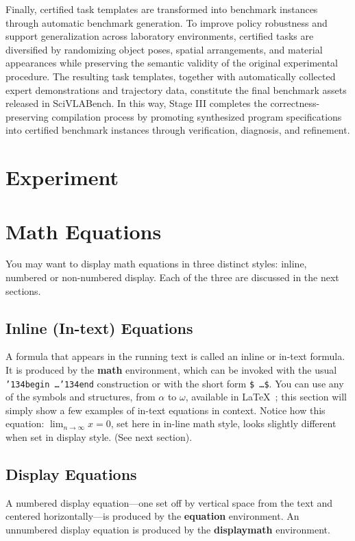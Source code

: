 \documentclass[sigconf]{acmart}
\begin{document}
Finally, certified task templates are transformed into benchmark instances through automatic benchmark generation. To improve policy robustness and support generalization across laboratory environments, certified tasks are diversified by randomizing object poses, spatial arrangements, and material appearances while preserving the semantic validity of the original experimental procedure. The resulting task templates, together with automatically collected expert demonstrations and trajectory data, constitute the final benchmark assets released in SciVLABench. In this way, Stage III completes the correctness-preserving compilation process by promoting synthesized program specifications into certified benchmark instances through verification, diagnosis, and refinement.

\section{Experiment}

\section{Math Equations}
You may want to display math equations in three distinct styles:
inline, numbered or non-numbered display.  Each of the three are
discussed in the next sections.

\subsection{Inline (In-text) Equations}
A formula that appears in the running text is called an inline or
in-text formula.  It is produced by the \textbf{math} environment,
which can be invoked with the usual
\texttt{{\char'134}begin\,\ldots{\char'134}end} construction or with
the short form \texttt{\$\,\ldots\$}. You can use any of the symbols
and structures, from $\alpha$ to $\omega$, available in
\LaTeX~\cite{Lamport:LaTeX}; this section will simply show a few
examples of in-text equations in context. Notice how this equation:
\begin{math}
  \lim_{n\rightarrow \infty}x=0
\end{math},
set here in in-line math style, looks slightly different when
set in display style.  (See next section).

\subsection{Display Equations}
A numbered display equation---one set off by vertical space from the
text and centered horizontally---is produced by the \textbf{equation}
environment. An unnumbered display equation is produced by the
\textbf{displaymath} environment.
\end{document}
